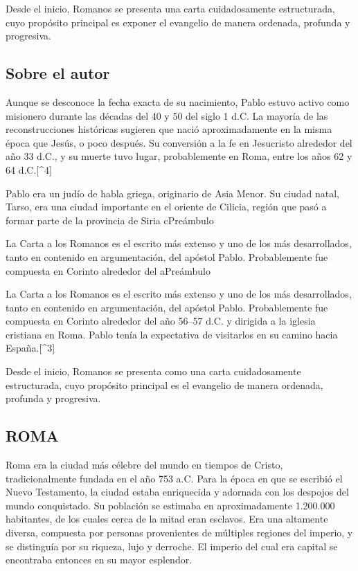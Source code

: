 Desde el inicio, Romanos se presenta  una carta
cuidadosamente estructurada, cuyo propósito principal es exponer el
evangelio de manera ordenada, profunda y progresiva.

\subsection{Sobre el autor}\label{sobre-el-autor}

Aunque se desconoce la fecha exacta de su nacimiento, Pablo estuvo
activo como misionero durante las décadas del 40 y 50 del siglo 1 d.C.
La mayoría de las reconstrucciones históricas sugieren que nació
aproximadamente en la misma época que Jesús, o poco después. Su
conversión a la fe en Jesucristo  alrededor del año 33
d.C., y su muerte tuvo lugar, probablemente en Roma, entre los años 62 y
64 d.C.{[}\^{}4{]}

Pablo era un judío de habla griega, originario de Asia Menor. Su ciudad
natal, Tarso, era una ciudad importante en el oriente de Cilicia, región
que pasó a formar parte de la provincia  de Siria
cPreámbulo

La Carta a los Romanos es el escrito más extenso y uno de los más
desarrollados, tanto en contenido  en argumentación, del
apóstol Pablo. Probablemente fue compuesta en Corinto alrededor del
aPreámbulo

La Carta a los Romanos es el escrito más extenso y uno de los más
desarrollados, tanto en contenido  en argumentación, del
apóstol Pablo. Probablemente fue compuesta en Corinto alrededor del año
56--57 d.C. y dirigida a la iglesia cristiana en Roma. Pablo tenía la
expectativa de visitarlos en su camino hacia España.{[}\^{}3{]}

Desde el inicio, Romanos se presenta como una carta cuidadosamente
estructurada, cuyo propósito principal es  el evangelio
de manera ordenada, profunda y progresiva.

\subsection{ROMA}\label{roma}

Roma era la ciudad más célebre del mundo en tiempos de Cristo,
tradicionalmente fundada en el año 753 a.C. Para la época en que se
escribió el Nuevo Testamento, la ciudad estaba enriquecida y adornada
con los despojos del mundo conquistado. Su población se estimaba en
aproximadamente 1.200.000 habitantes, de los cuales cerca de la mitad
eran esclavos. Era una  altamente diversa, compuesta por
personas provenientes de múltiples regiones del imperio, y se distinguía
por su riqueza, lujo y derroche. El imperio del cual era capital se
encontraba entonces en su mayor esplendor.

